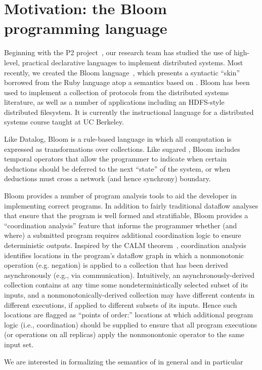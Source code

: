 \section{Motivation: the Bloom programming language}

Beginning with the P2 project~\cite{p2}, our research team has studied the use of high-level, practical declarative languages
to implement distributed systems.  Most recently, we created the Bloom language~\cite{bloom}, which presents a syntactic ``skin''
borrowed from the Ruby language atop a semantics based on \lang.  Bloom has been used to implement a collection of protocols from the distributed
systems literature, as well as a number of applications including an HDFS-style distributed filesystem.  It is currently the instructional language for a distributed systems course
taught at UC Berkeley.

Like Datalog, Bloom is a rule-based language in which all computation is expressed as transformations over collections.  Like sugared \lang,
Bloom includes temporal operators that allow the programmer to indicate when certain deductions should be deferred to the next ``state'' of 
the system, or when deductions must cross a network (and hence synchrony) boundary. 

Bloom provides a number of program analysis tools to aid the developer in implementing correct programs.  In addition to fairly traditional dataflow analyses
that ensure that the program is well formed and stratifiable, Bloom provides a ``coordination analysis'' feature that informs the programmer whether (and where)
a submitted program requires additional coordination logic to ensure deterministic outputs.  Inspired by the CALM theorem~\cite{calm}, coordination analysis 
identifies locations in the program's dataflow graph in which a nonmonotonic operation (e.g. negation) is applied to a collection that has been derived asynchronously
(e.g., via communication).  Intuitively, an asynchronously-derived collection contains at any time some nondeterministically selected subset of its inputs, and a 
nonmonotonically-derived collection may have different contents in different executions, if applied to different subsets of its inputs.  Hence such locations are
flagged as ``points of order:'' locations at which additional program logic (i.e., coordination) should be supplied to ensure that all program executions (or operations
on all replicas) apply the nonmonontonic operator to the same input set.

We are interested in formalizing the semantics of \lang in general and \plang in particular
